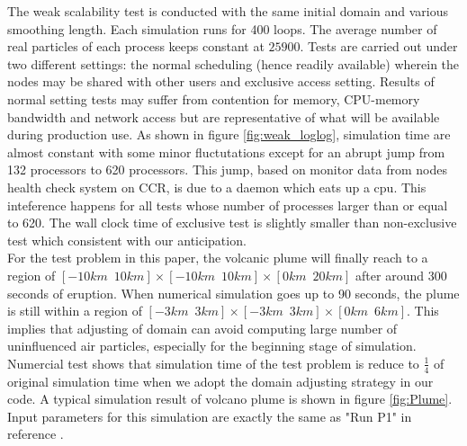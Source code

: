 \documentclass[conference,compsoc]{IEEEtran}
\begin{document}
The weak scalability test is conducted with the same initial domain and various smoothing length. Each simulation runs for 400 loops. The average number of real particles of each process keeps constant at $25900$. 
Tests are carried out under two different settings: the normal scheduling (hence readily available) wherein the nodes may be shared with other users and exclusive access setting. Results of normal setting tests may suffer from contention for memory, CPU-memory bandwidth and network access but are representative of what will be available during production use.
As shown in figure \ref{fig:weak_loglog}, simulation time are almost constant with some minor fluctutations except for an abrupt jump from 132 processors to 620 processors. This jump, based on monitor data from nodes health check system on CCR, is due to a daemon which eats up a cpu. This inteference happens for all tests whose number of processes larger than or equal to 620. The wall clock time of exclusive test is slightly smaller than non-exclusive test which consistent with our anticipation. 
\\
%
%
For the test problem in this paper, the volcanic plume will finally reach to a region of $[-10km \,\,\, 10km] \times [-10km\,\,\,10km] \times [0km\,\,\,20km]$ after around 300 seconds of eruption. When numerical simulation goes up to 90 seconds, the plume is still within a region of $[-3km\,\,\,3km] \times [-3km\,\,\,3km] \times [0km\,\,\,6km]$. This implies that adjusting of domain can avoid computing large number of uninfluenced air particles, especially for the beginning stage of simulation. Numercial test shows that simulation time of the test problem is reduce to $\frac{1}{4}$ of original simulation time when we adopt the domain adjusting strategy in our code. 
A typical simulation result of volcano plume is shown in figure \ref{fig:Plume}. Input parameters for this simulation are exactly the same as "Run P1" in reference \cite{suzuki2005numerical}.
\end{document}

